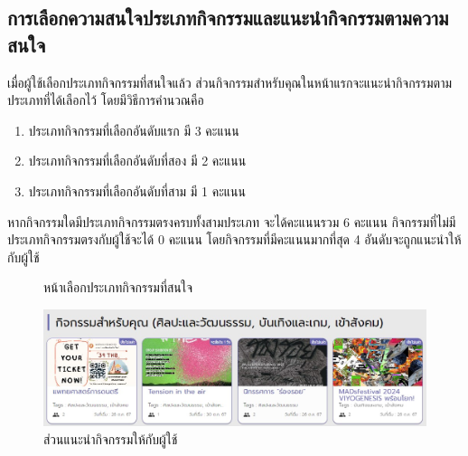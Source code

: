 \subsection{การเลือกความสนใจประเภทกิจกรรมและแนะนำกิจกรรมตามความสนใจ}
เมื่อผู้ใช้เลือกประเภทกิจกรรมที่สนใจแล้ว ส่วนกิจกรรมสำหรับคุณในหน้าแรกจะแนะนำกิจกรรมตามประเภทที่ได้เลือกไว้ โดยมีวิธีการคำนวณคือ
\begin{enumerate}
    \item ประเภทกิจกรรมที่เลือกอันดับแรก มี 3 คะแนน
    \item ประเภทกิจกรรมที่เลือกอันดับที่สอง มี 2 คะแนน
    \item ประเภทกิจกรรมที่เลือกอันดับที่สาม มี 1 คะแนน
\end{enumerate}
หากกิจกรรมใดมีประเภทกิจกรรมตรงครบทั้งสามประเภท จะได้คะแนนรวม 6 คะแนน กิจกรรมที่ไม่มีประเภทกิจกรรมตรงกับผู้ใช้จะได้ 0 คะแนน โดยกิจกรรมที่มีคะแนนมากที่สุด 4 อันดับจะถูกแนะนำให้กับผู้ใช้
\begin{figure}[H]
    \begin{center}
    \end{center}
    \caption[ผลทดลองหน้าเลือกประเภทกิจกรรมที่สนใจ]{หน้าเลือกประเภทกิจกรรมที่สนใจ}
    \label{fig:tag-choose-2}
\end{figure}
\begin{figure}[H]
    \begin{center}
    \includegraphics[scale=0.5]{public/tag-choose-result.jpg}
    \end{center}
    \caption[ผลทดลองส่วนแนะนำกิจกรรมให้กับผู้ใช้]{ส่วนแนะนำกิจกรรมให้กับผู้ใช้}
    \label{fig:tag-reccommend}
\end{figure}

